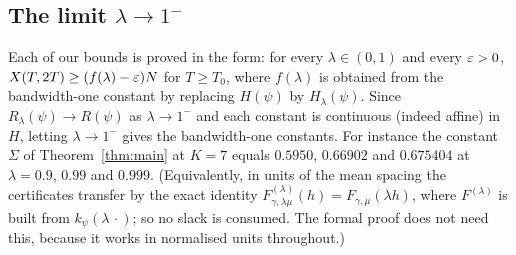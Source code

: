 \subsection{The limit \texorpdfstring{$\lambda\to1^-$}{lambda to 1}}\label{ssec:bandwidth}
Each of our bounds is proved in the form: for every $\lambda\in(0,1)$ and every $\varepsilon>0$, $X(T,2T)\ge(f(\lambda)-\varepsilon)N$ for $T\ge T_0$, where
$f(\lambda)$ is obtained from the bandwidth-one constant by replacing $H(\psi)$ by $H_\lambda(\psi)$. Since $R_\lambda(\psi)\to R(\psi)$ as
$\lambda\to1^-$ and each constant is continuous (indeed affine) in $H$, letting $\lambda\to1^-$ gives the bandwidth-one constants. For instance the
constant $\Sigma$ of Theorem~\ref{thm:main} at $K=7$ equals $0.5950$, $0.66902$ and $0.675404$ at $\lambda=0.9$, $0.99$ and $0.999$.
(Equivalently, in units of the mean spacing the certificates transfer by the exact identity $F^{(\lambda)}_{\gamma,\lambda\mu}(h)=F_{\gamma,\mu}(\lambda h)$,
where $F^{(\lambda)}$ is built from $k_\psi(\lambda\,\cdot)$; so no slack is consumed. The formal proof does not need this, because it works in
normalised units throughout.)
